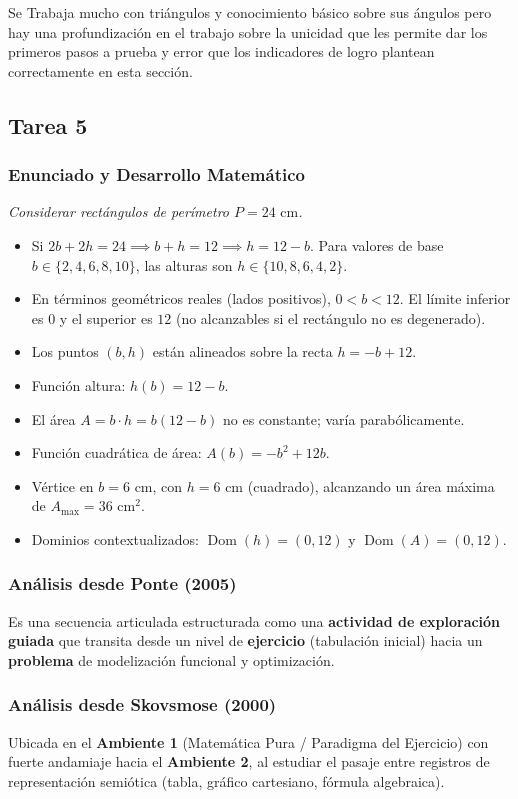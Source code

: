\documentclass[11pt,a4paper]{article}
\begin{document}
Se Trabaja mucho con triángulos y conocimiento básico sobre sus ángulos pero hay una profundización en el trabajo sobre la unicidad que les permite dar los primeros pasos a prueba y error que los indicadores de logro plantean correctamente en esta sección.
\subsection{Tarea 5}

\subsubsection{Enunciado y Desarrollo Matemático}
\textit{Considerar rectángulos de perímetro $P = 24\text{ cm}$.}
\begin{itemize}
    \item[a)] Si $2b + 2h = 24 \implies b + h = 12 \implies h = 12 - b$. Para valores de base $b \in \{2, 4, 6, 8, 10\}$, las alturas son $h \in \{10, 8, 6, 4, 2\}$.
    \item[b)] En términos geométricos reales (lados positivos), $0 < b < 12$. El límite inferior es $0$ y el superior es $12$ (no alcanzables si el rectángulo no es degenerado).
    \item[c)] Los puntos $(b, h)$ están alineados sobre la recta $h = -b + 12$.
    \item[d)] Función altura: $h(b) = 12 - b$.
    \item[e)] El área $A = b \cdot h = b(12 - b)$ no es constante; varía parabólicamente.
    \item[f-h)] Función cuadrática de área: $A(b) = -b^2 + 12b$.
    \item[g)] Vértice en $b = 6\text{ cm}$, con $h = 6\text{ cm}$ (cuadrado), alcanzando un área máxima de $A_{\max} = 36\text{ cm}^2$.
    \item[i)] Dominios contextualizados: $\operatorname{Dom}(h) = (0, 12)$ y $\operatorname{Dom}(A) = (0, 12)$.
\end{itemize}

\subsubsection{Análisis desde Ponte (2005)}
Es una secuencia articulada estructurada como una \textbf{actividad de exploración guiada} que transita desde un nivel de \textbf{ejercicio} (tabulación inicial) hacia un \textbf{problema} de modelización funcional y optimización.

\subsubsection{Análisis desde Skovsmose (2000)}
Ubicada en el \textbf{Ambiente 1} (Matemática Pura / Paradigma del Ejercicio) con fuerte andamiaje hacia el \textbf{Ambiente 2}, al estudiar el pasaje entre registros de representación semiótica (tabla, gráfico cartesiano, fórmula algebraica).
\end{document}

